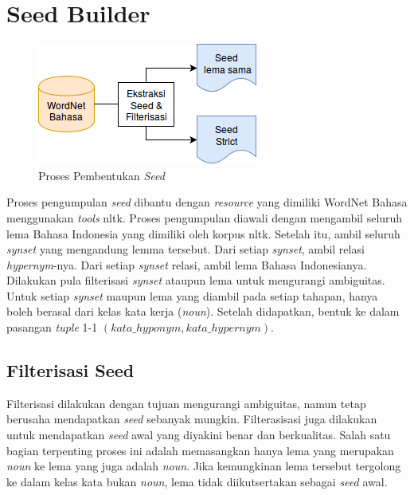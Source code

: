 \section{Seed Builder}
\begin{figure}
    \centering
    \includegraphics[scale=0.6]{pics/Pic02-SeedBuilder}
    \caption{Proses Pembentukan \textit{Seed}}
    \label{fig:seed-builder}
\end{figure}
Proses pengumpulan \textit{seed} dibantu dengan \textit{resource} yang dimiliki WordNet Bahasa menggunakan \textit{tools} nltk. Proses pengumpulan diawali dengan mengambil seluruh lema Bahasa Indonesia yang dimiliki oleh korpus nltk. Setelah itu, ambil seluruh \textit{synset} yang mengandung lemma tersebut. Dari setiap \textit{synset}, ambil relasi \textit{hypernym}-nya. Dari setiap \textit{synset} relasi, ambil lema Bahasa Indonesianya. Dilakukan pula filterisasi \textit{synset} ataupun lema untuk mengurangi ambiguitas. Untuk setiap \textit{synset} maupun lema yang diambil pada setiap tahapan, hanya boleh berasal dari kelas kata kerja (\textit{noun}). Setelah didapatkan, bentuk ke dalam pasangan \textit{tuple} 1-1 $(kata\_hyponym,kata\_hypernym)$.

\subsection{Filterisasi Seed}
Filterisasi dilakukan dengan tujuan mengurangi ambiguitas, namun tetap berusaha mendapatkan \textit{seed} sebanyak mungkin. Filterasisasi juga dilakukan untuk mendapatkan \textit{seed} awal yang diyakini benar dan berkualitas. Salah satu bagian terpenting proses ini adalah memasangkan hanya lema yang merupakan \textit{noun} ke lema yang juga adalah \textit{noun}. Jika kemungkinan lema tersebut tergolong ke dalam kelas kata bukan \textit{noun}, lema tidak diikutsertakan sebagai \textit{seed} awal.

